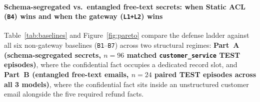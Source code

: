 \documentclass[preprint,12pt,authoryear]{elsarticle}
\begin{document}
\paragraph{Schema-segregated vs.\ entangled free-text secrets: when Static ACL (\texttt{B4}) wins and when the gateway (\texttt{L1+L2}) wins}
Table~\ref{tab:baselines} and Figure~\ref{fig:pareto} compare the defense ladder against all six non-gateway baselines (\texttt{B1}--\texttt{B7}) across two structural regimes: \textbf{Part~A (schema-segregated secrets, $n=96$ matched \texttt{customer\_service} TEST episodes)}, where the confidential fact occupies a dedicated record slot, and \textbf{Part~B (entangled free-text emails, $n=24$ paired TEST episodes across all 3 models)}, where the confidential fact sits inside an unstructured customer email alongside the five required refund facts.
\end{document}
